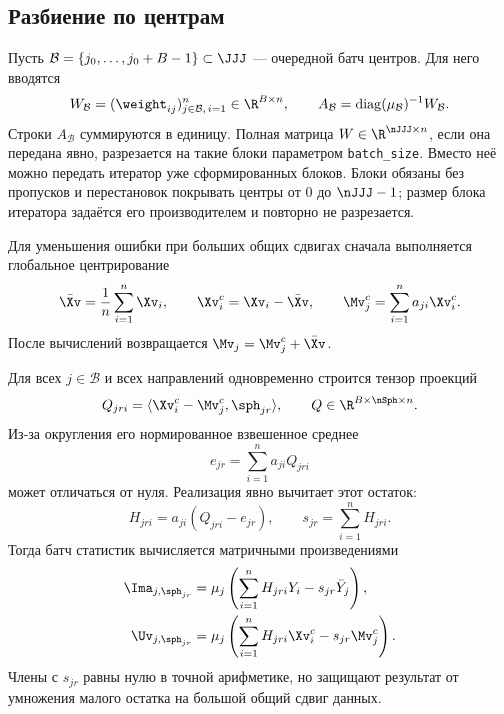 \subsection{Разбиение по центрам}

Пусть
$\mathcal B=\{j_0,\ldots,j_0+B-1\}\subset\JJJ$
--- очередной батч центров. Для него вводятся
\begin{equation}
    W_{\mathcal B}
    =
    (\weight_{ij})_{j\in\mathcal B,\,i=1}^n
    \in\R^{B\times n},
    \qquad
    A_{\mathcal B}
    =
    \operatorname{diag}(\mu_{\mathcal B})^{-1}W_{\mathcal B}.
\label{eq:batch-adp-normalized-weights}
\end{equation}
Строки $A_{\mathcal B}$ суммируются в единицу.
Полная матрица $W\in\R^{\nJJJ\times n}$, если она передана явно,
разрезается на такие блоки параметром \texttt{batch\_size}. Вместо неё
можно передать итератор уже сформированных блоков. Блоки обязаны без
пропусков и перестановок покрывать центры от $0$ до $\nJJJ-1$; размер
блока итератора задаётся его производителем и повторно не разрезается.

Для уменьшения ошибки при больших общих сдвигах сначала выполняется
глобальное центрирование
\begin{equation}
    \bar\Xv=\frac1n\sum_{i=1}^n\Xv_i,
    \qquad
    \Xv_i^c=\Xv_i-\bar\Xv,
    \qquad
    \Mv_j^c=\sum_{i=1}^na_{ji}\Xv_i^c.
\label{eq:batch-adp-global-centering}
\end{equation}
После вычислений возвращается
$\Mv_j=\Mv_j^c+\bar\Xv$.

Для всех $j\in\mathcal B$ и всех направлений одновременно строится
тензор проекций
\begin{equation}
    Q_{jri}
    =
    \langle\Xv_i^c-\Mv_j^c,\sph_{jr}\rangle,
    \qquad
    Q\in\R^{B\times\nSph\times n}.
\label{eq:batch-adp-Q}
\end{equation}
Из-за округления его нормированное взвешенное среднее
\begin{equation}
    e_{jr}=\sum_{i=1}^na_{ji}Q_{jri}
\label{eq:batch-adp-residual}
\end{equation}
может отличаться от нуля. Реализация явно вычитает этот остаток:
\begin{equation}
    H_{jri}=a_{ji}(Q_{jri}-e_{jr}),
    \qquad
    s_{jr}=\sum_{i=1}^nH_{jri}.
\label{eq:batch-adp-H}
\end{equation}
Тогда батч статистик вычисляется матричными произведениями
\begin{align}
    \Ima_{j,\sph_{jr}}
    &=
    \mu_j\left(
        \sum_{i=1}^nH_{jri}Y_i-s_{jr}\bar Y_j
    \right),
\label{eq:batch-adp-I-stable}
    \\
    \Uv_{j,\sph_{jr}}
    &=
    \mu_j\left(
        \sum_{i=1}^nH_{jri}\Xv_i^c-s_{jr}\Mv_j^c
    \right).
\label{eq:batch-adp-U-stable}
\end{align}
Члены с $s_{jr}$ равны нулю в точной арифметике, но защищают результат
от умножения малого остатка на большой общий сдвиг данных.

